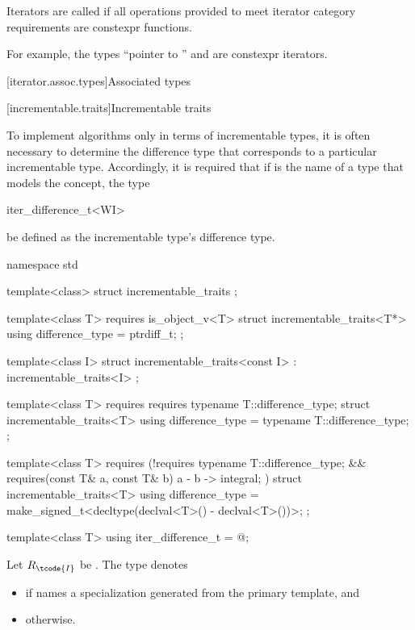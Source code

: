 \pnum
{}%
Iterators are called 
if all operations provided to meet iterator category requirements
are constexpr functions.
\begin{note}
For example, the types ``pointer to '' and
 are constexpr iterators.
\end{note}

[iterator.assoc.types]{Associated types}

[incrementable.traits]{Incrementable traits}

\pnum
To implement algorithms only in terms of incrementable types,
it is often necessary to determine the difference type that
corresponds to a particular incrementable type. Accordingly,
it is required that if  is the name of a type that models the
 concept,
the type
\begin{codeblock}
iter_difference_t<WI>
\end{codeblock}
be defined as the incrementable type's difference type.

%
\begin{codeblock}
namespace std {
  template<class> struct incrementable_traits { };

  template<class T>
    requires is_object_v<T>
  struct incrementable_traits<T*> {
    using difference_type = ptrdiff_t;
  };

  template<class I>
  struct incrementable_traits<const I>
    : incrementable_traits<I> { };

  template<class T>
    requires requires { typename T::difference_type; }
  struct incrementable_traits<T> {
    using difference_type = typename T::difference_type;
  };

  template<class T>
    requires (!requires { typename T::difference_type; } &&
              requires(const T& a, const T& b) { { a - b } -> integral; })
  struct incrementable_traits<T> {
    using difference_type = make_signed_t<decltype(declval<T>() - declval<T>())>;
  };

  template<class T>
    using iter_difference_t = @\seebelow@;
}
\end{codeblock}

%
\pnum
Let $R_\tcode{I}$ be .
The type  denotes
\begin{itemize}
\item
{}
if  names a specialization
generated from the primary template, and

\item
{} otherwise.
\end{itemize}

